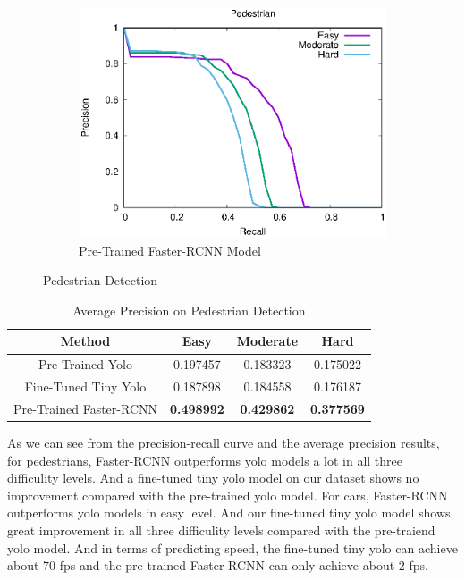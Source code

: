 \begin{figure}[H]
\begin{subfigure}{.34\textwidth}
    \includegraphics[width=1.0\linewidth]{img/FRCNN_Nov_8/plot_valid/pedestrian_detection.eps}
    \caption{Pre-Trained Faster-RCNN Model}
\end{subfigure}
\caption{Pedestrian Detection}
\end{figure}

\begin{table}[h!]
\centering
\begin{tabular}{ c | c | c | c }
\hline
Method & Easy & Moderate & Hard \\
\hline \hline
Pre-Trained Yolo & 0.197457 & 0.183323 & 0.175022 \\
Fine-Tuned Tiny Yolo & 0.187898 & 0.184558 & 0.176187 \\
Pre-Trained Faster-RCNN & \bfseries 0.498992 & \bfseries 0.429862 & \bfseries 0.377569 \\
\hline
\end{tabular}
\caption{Average Precision on Pedestrian Detection}
\end{table}

As we can see from the precision-recall curve and the average precision results, for pedestrians, Faster-RCNN outperforms yolo models a lot in all three difficulity levels. And a fine-tuned tiny yolo model on our dataset shows no improvement compared with the pre-trained yolo model. For cars, Faster-RCNN outperforms yolo models in easy level. And our fine-tuned tiny yolo model shows great improvement in all three difficulity levels compared with the pre-traiend yolo model. And
in terms of predicting speed, the fine-tuned tiny yolo can achieve about 70 fps and the pre-trained Faster-RCNN can only achieve about 2 fps.